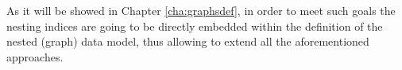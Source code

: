 As it will be showed in Chapter \ref{cha:graphsdef}, in order to meet such goals the nesting indices are going to be directly embedded within the definition of the nested (graph) data model, thus allowing to extend all the aforementioned approaches.